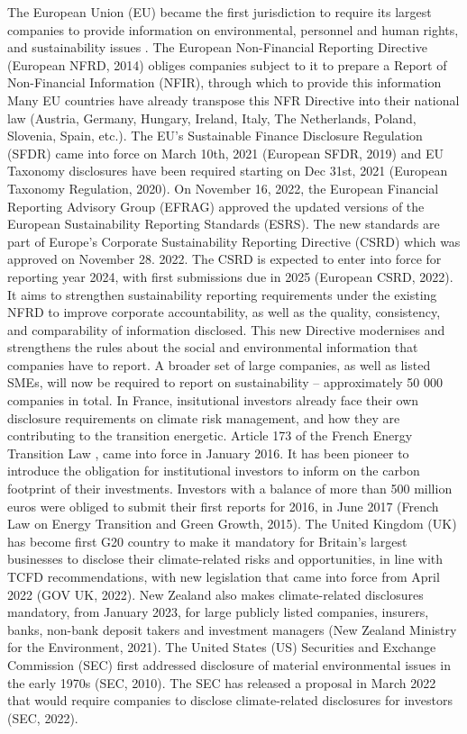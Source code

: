 \documentclass[runningheads]{llncs}
\begin{document}
The European Union (EU) became the first jurisdiction to require its largest companies to provide information on environmental, personnel and human rights, and sustainability issues \cite{steffen2021comparative}. The European Non-Financial Reporting Directive (European NFRD, 2014) obliges companies subject to it to prepare a Report of Non-Financial Information (NFIR), through which to provide this information Many EU countries have already transpose this NFR Directive into their national law (Austria, Germany, Hungary, Ireland, Italy, The Netherlands, Poland, Slovenia, Spain, etc.). The EU’s Sustainable Finance Disclosure Regulation (SFDR) came into force on March 10th, 2021 (European SFDR, 2019) and EU Taxonomy disclosures have been required starting on Dec 31st, 2021 (European Taxonomy Regulation, 2020). On November 16, 2022, the European Financial Reporting Advisory Group (EFRAG) approved the updated versions of the European Sustainability Reporting Standards (ESRS). The new standards are part of Europe’s Corporate Sustainability Reporting Directive (CSRD) which was approved on November 28. 2022. The CSRD is expected to enter into force for reporting year 2024, with first submissions due in 2025 (European CSRD, 2022). It aims to strengthen sustainability reporting requirements under the existing NFRD to improve corporate accountability, as well as the quality, consistency, and comparability of information disclosed. This new Directive modernises and strengthens the rules about the social and environmental information that companies have to report. A broader set of large companies, as well as listed SMEs, will now be required to report on sustainability – approximately 50 000 companies in total. In France, insitutional investors already face their own disclosure requirements on climate risk management, and how they are contributing to the transition energetic. Article 173 of the French Energy Transition Law , came into force in January 2016. It has been pioneer to introduce the obligation for institutional investors to inform on the carbon footprint of their investments. Investors with a balance of more than 500 million euros were obliged to submit their first reports for 2016, in June 2017 (French Law on Energy Transition and Green Growth, 2015). The United Kingdom (UK) has become first G20 country to make it mandatory for Britain’s largest businesses to disclose their climate-related risks and opportunities, in line with TCFD recommendations, with new legislation that came into force from April 2022 (GOV UK, 2022). New Zealand also makes climate-related disclosures mandatory, from January 2023, for large publicly listed companies, insurers, banks, non-bank deposit takers and investment managers (New Zealand Ministry for the Environment, 2021). The United States (US) Securities and Exchange Commission (SEC) first addressed disclosure of material environmental issues in the early 1970s (SEC, 2010).  The SEC has released a proposal in March 2022 that would require companies to disclose climate-related disclosures for investors (SEC, 2022).  
\end{document}
